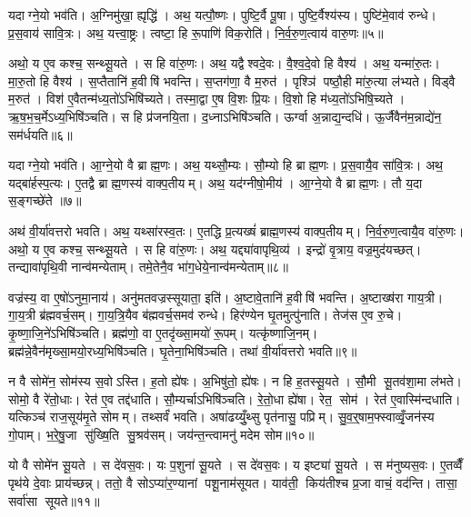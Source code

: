 यदाग्ने॒यो भव॑ति। अ॒ग्निमु॑खा॒ ह्यृद्धि॑। अथ॒ यत्पौ॒ष्णः। पुष्टि॒र्वै पू॒षा। पुष्टि॒र्वैश्य॑स्य। पुष्टि॑मे॒वाव॑ रुन्धे। प्र॒स॒वाय॑ सावि॒त्रः। अथ॒ यत्त्वा॒ष्ट्रः। त्वष्टा॒ हि रू॒पाणि॑ विक॒रोति॑। नि॒र्व॒रु॒ण॒त्वाय॑ वारु॒णः॥५॥

अथो॒ य ए॒व कश्च॒ सन्थ्सू॒यते। स हि वा॑रु॒णः। अथ॒ यद्वैश्वदे॒वः। वै॒श्व॒दे॒वो हि वैश्य॑। अथ॒ यन्मा॑रु॒तः। मा॒रु॒तो हि वैश्य॑। स॒प्तैतानि॑ ह॒वीषि॑ भवन्ति। स॒प्तग॑णा॒ वै म॒रुत॑। पृश्ञि॑ पष्ठौ॒ही मा॑रु॒त्या ल॑भ्यते। विड्वै म॒रुत॑। विश॑ ए॒वैतन्म॑ध्य॒तो॑ऽभिषि॑च्यते। तस्मा॒द्वा ए॒ष वि॒शः प्रि॒यः। वि॒शो हि म॑ध्य॒तो॑ऽभिषि॒च्यते। ऋ॒ष॒भ॒च॒र्मेऽध्य॒भिषि॑ञ्चति। स हि प्र॑जनयि॒ता। द॒ध्नाऽभिषि॑ञ्चति। ऊर्ग्वा अ॒न्नाद्य॒न्दधि॑। ऊ॒र्जैवैन॑म॒न्नाद्ये॑न॒ सम॑र्धयति॥६॥\anuvakamend[वा॒रु॒णो विड्वै म॒रुतो॒ऽष्टौ च॑]

यदाग्ने॒यो भव॑ति। आ॒ग्ने॒यो वै ब्राह्म॒णः। अथ॒ यथ्सौ॒म्यः। सौ॒म्यो हि ब्राह्म॒णः। प्र॒स॒वायै॒व सा॑वि॒त्रः। अथ॒ यद्बा॑र्\mbox{}हस्प॒त्यः। ए॒तद्वै ब्राह्म॒णस्य॑ वाक्प॒तीयम्। अथ॒ यद॑ग्नीषो॒मीय॑। आ॒ग्ने॒यो वै ब्राह्म॒णः। तौ य॒दा स॒ङ्गच्छे॑ते ॥७॥

अथ॑ वी॒र्या॑वत्तरो भवति। अथ॒ यथ्सा॑रस्व॒तः। ए॒तद्धि प्र॒त्यख्षं॑ ब्राह्म॒णस्य॑ वाक्प॒तीयम्। नि॒र्व॒रु॒ण॒त्वायै॒व वा॑रु॒णः। अथो॒ य ए॒व कश्च॒ सन्थ्सू॒यते। स हि वा॑रु॒णः। अथ॒ यद्द्या॑वापृथि॒व्य॑। इन्द्रो॑ वृ॒त्राय॒ वज्र॒मुद॑यच्छत्। तन्द्यावा॑पृथि॒वी नान्व॑मन्येताम्। तमे॒तेनै॒व भा॑ग॒धेये॒नान्व॑मन्येताम्॥८॥

वज्र॑स्य॒ वा ए॒षो॑ऽनुमा॒नाय॑। अनु॑मतवज्रस्सूयाता॒ इति॑। अ॒ष्टावे॒तानि॑ ह॒वीषि॑ भवन्ति। अ॒ष्टाख्ष॑रा गाय॒त्री। गा॒य॒त्री ब्र॑ह्मवर्च॒सम्। गा॒य॒त्रि॒यैव ब॑ह्मवर्च॒समव॑ रुन्धे। हिर॑ण्येन घृ॒तमुत्पु॑नाति। तेज॑स ए॒व रु॒चे। कृ॒ष्णा॒जि॒ने॑ऽभिषि॑ञ्चति। ब्रह्म॑णो॒ वा ए॒तदृ॑ख्सा॒मयो॑ रू॒पम्। यत्कृ॑ष्णाजि॒नम्। ब्रह्म॑न्ने॒वैन॑मृख्सा॒मयो॒रध्य॒भिषि॑ञ्चति। घृ॒तेना॒भिषि॑ञ्चति। तथा॑ वी॒र्या॑वत्तरो भवति॥९॥\anuvakamend[स॒ङ्गच्छे॑ते भाग॒धेये॒नान्व॑मन्येता रू॒पञ्च॒त्वारि॑ च]

न वै सोमे॑न॒ सोम॑स्य स॒वोऽस्ति। ह॒तो ह्ये॑षः। अ॒भिषु॑तो॒ ह्ये॑षः। न हि ह॒तस्सू॒यते। सौ॒मी सू॒तव॑शा॒मा ल॑भते। सोमो॒ वै रे॑तो॒धाः। रेत॑ ए॒व तद्द॑धाति। सौ॒म्यर्चाऽभिषि॑ञ्चति। रे॒तो॒धा ह्ये॑षा। रेत॒ सोम॑। रेत॑ ए॒वास्मि॑न्दधाति। यत्किञ्च॑ राज॒सूय॑मृ॒ते सोमम्। तथ्सर्वं॑ भवति। अषा॑ढय्युँ॒थ्सु पृत॑नासु॒ पप्रिम्। सु॒व॒र्॒षाम॒फ्स्वाव्वृँ॒जन॑स्य गो॒पाम्। भ॒रे॒षु॒जा सु॑ख्षि॒ति सु॒श्रव॑सम्। जय॑न्त॒न्त्वामनु॑ मदेम सोम॥१०॥\anuvakamend[रेत॒ सोम॑ स॒प्त च॑]

यो वै सोमे॑न सू॒यते। स दे॑वस॒वः। यः प॒शुना॑ सू॒यते। स दे॑वस॒वः। य इष्ट्या॑ सू॒यते। स म॑नुष्यस॒वः। ए॒तव्वैँ पृथ॑ये दे॒वाः प्राय॑च्छन्न्। ततो॒ वै सोऽप्या॑र॒ण्यानां पशू॒नाम॑सूयत। याव॑ती॒ किय॑तीश्च प्र॒जा वाचं॒ वद॑न्ति। तासा॒ सर्वा॑सा सूयते॥११॥

